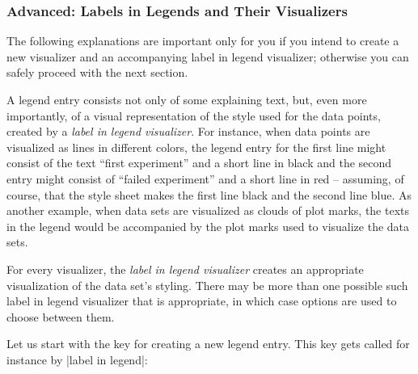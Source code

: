 \subsubsection{Advanced: Labels in Legends and Their Visualizers}

\label{section-dv-legend-entries}

The following explanations are important only for you if you intend to
create a new visualizer and an accompanying label in legend
visualizer; otherwise you can safely proceed with the next section.

A legend entry consists not only of some explaining text, but, even
more importantly, of a visual representation of the style used for the
data points, created by a \emph{label in legend visualizer}. For
instance, when data points are visualized as lines in 
different colors, the legend entry for the first line might consist of
the text ``first experiment'' and a short line in black and the second
entry might consist of ``failed experiment'' and a short line in red
-- assuming, of course, that the style sheet makes the first line
black and the second line blue. As another example, when data sets are
visualized as clouds of plot marks, the texts in the legend would be
accompanied by the plot marks used to visualize the data sets.

For every visualizer, the \emph{label in legend visualizer} creates an
appropriate visualization of the data set's styling. There may be more
than one possible such label in legend visualizer that is appropriate,
in which case options are used to choose between them.

Let us start with the key for creating a new legend entry. This key
gets called for instance by |label in legend|:

